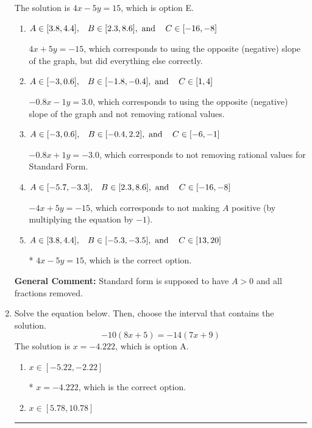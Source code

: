 \documentclass{extbook}[14pt]
\newcommand{\litem}[1]{\item #1

\rule{\textwidth}{0.4pt}}
\begin{document}
\begin{enumerate}
{The solution is \( 4x - 5y = 15 \), which is option E.\begin{enumerate}[label=\Alph*.]
\item \( A \in [3.8, 4.4], \hspace{3mm} B \in [2.3, 8.6], \text{ and } \hspace{3mm} C \in [-16, -8] \)

 $4x + 5y = -15$, which corresponds to using the opposite (negative) slope of the graph, but did everything else correctly.
\item \( A \in [-3, 0.6], \hspace{3mm} B \in [-1.8, -0.4], \text{ and } \hspace{3mm} C \in [1, 4] \)

 $-0.8x - 1y = 3.0$, which corresponds to using the opposite (negative) slope of the graph and not removing rational values.
\item \( A \in [-3, 0.6], \hspace{3mm} B \in [-0.4, 2.2], \text{ and } \hspace{3mm} C \in [-6, -1] \)

 $-0.8x + 1y = -3.0$, which corresponds to not removing rational values for Standard Form.
\item \( A \in [-5.7, -3.3], \hspace{3mm} B \in [2.3, 8.6], \text{ and } \hspace{3mm} C \in [-16, -8] \)

 $-4x + 5y = -15$, which corresponds to not making $A$ positive (by multiplying the equation by $-1$).
\item \( A \in [3.8, 4.4], \hspace{3mm} B \in [-5.3, -3.5], \text{ and } \hspace{3mm} C \in [13, 20] \)

* $4x - 5y = 15$, which is the correct option.
\end{enumerate}

\textbf{General Comment:} Standard form is supposed to have $A > 0$ and all fractions removed.
}
\litem{
Solve the equation below. Then, choose the interval that contains the solution.
\[ -10(8x + 5) = -14(7x + 9) \]The solution is \( x = -4.222 \), which is option A.\begin{enumerate}[label=\Alph*.]
\item \( x \in [-5.22, -2.22] \)

* $x = -4.222$, which is the correct option.
\item \( x \in [5.78, 10.78] \)


\end{enumerate}}
\end{enumerate}
\end{document}
